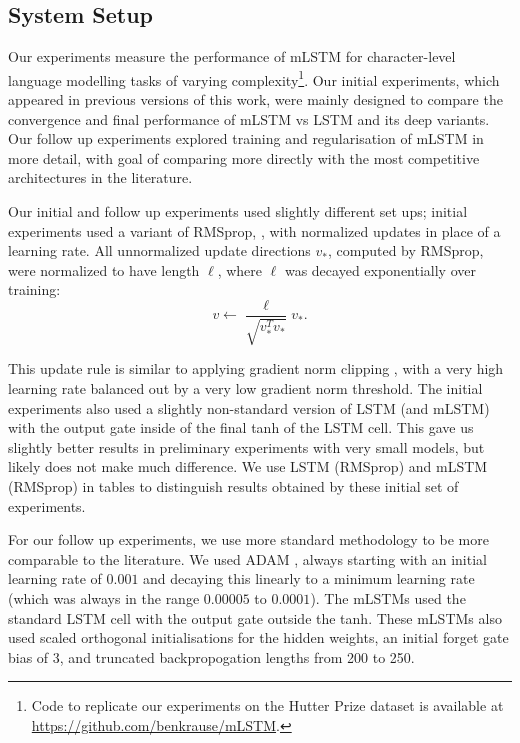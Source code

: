 \documentclass{article}
\begin{document}
\subsection{System Setup}

Our experiments measure the performance of mLSTM for character-level language modelling tasks of varying complexity\footnote{Code to replicate our experiments on the Hutter Prize dataset is available at \url{https://github.com/benkrause/mLSTM}.}. Our initial experiments, which appeared in previous versions of this work, were mainly designed to compare the convergence and final performance of mLSTM vs LSTM and its deep variants. Our follow up experiments explored training and regularisation of mLSTM in more detail, with goal of comparing more directly with the most competitive architectures in the literature. 

Our initial and follow up experiments used slightly different set ups; initial experiments used a variant of RMSprop, \citep{tieleman2012}, with normalized updates in place of a learning rate. All unnormalized update directions $v_*$, computed by RMSprop, were normalized to have length $\ell$, where $\ell$ was decayed exponentially over training:
\begin{equation}
v \leftarrow \frac{\ell}{\sqrt{v_*^T v_*}} v_*  .
\end{equation}

This update rule is similar to applying gradient norm clipping \citep{pascanu2013}, with a very high learning rate balanced out by a very low gradient norm threshold. The initial experiments also used a slightly non-standard version of LSTM (and mLSTM) with the output gate inside of the final tanh of the LSTM cell. This gave us slightly better results in preliminary experiments with very small models, but likely does not make much difference. We use LSTM (RMSprop) and mLSTM (RMSprop) in tables to distinguish results obtained by these initial set of experiments.

For our follow up experiments, we use more standard methodology to be more comparable to the literature. We used ADAM \citep{kingma2014}, always starting with an initial learning rate of $0.001$ and decaying this linearly to a minimum learning rate (which was always in the range $0.00005$ to $0.0001$). The mLSTMs used the standard LSTM cell with the output gate outside the tanh. These mLSTMs also used scaled orthogonal initialisations \citep{saxe2013} for the hidden weights, an initial forget gate bias of 3, and truncated backpropogation lengths from 200 to 250.
\end{document}

